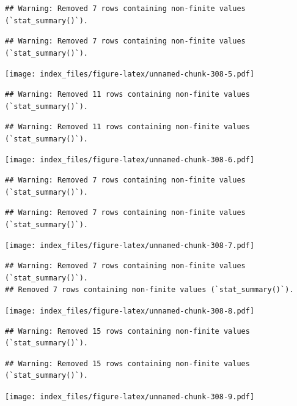 \documentclass[
]{article}
\begin{document}
\begin{verbatim}
## Warning: Removed 7 rows containing non-finite values (`stat_summary()`).
\end{verbatim}

\begin{verbatim}
## Warning: Removed 7 rows containing non-finite values (`stat_summary()`).
\end{verbatim}

\texttt{[image: index\_files/figure-latex/unnamed-chunk-308-5.pdf]}

\begin{verbatim}
## Warning: Removed 11 rows containing non-finite values (`stat_summary()`).
\end{verbatim}

\begin{verbatim}
## Warning: Removed 11 rows containing non-finite values (`stat_summary()`).
\end{verbatim}

\texttt{[image: index\_files/figure-latex/unnamed-chunk-308-6.pdf]}

\begin{verbatim}
## Warning: Removed 7 rows containing non-finite values (`stat_summary()`).
\end{verbatim}

\begin{verbatim}
## Warning: Removed 7 rows containing non-finite values (`stat_summary()`).
\end{verbatim}

\texttt{[image: index\_files/figure-latex/unnamed-chunk-308-7.pdf]}

\begin{verbatim}
## Warning: Removed 7 rows containing non-finite values (`stat_summary()`).
## Removed 7 rows containing non-finite values (`stat_summary()`).
\end{verbatim}

\texttt{[image: index\_files/figure-latex/unnamed-chunk-308-8.pdf]}

\begin{verbatim}
## Warning: Removed 15 rows containing non-finite values (`stat_summary()`).
\end{verbatim}

\begin{verbatim}
## Warning: Removed 15 rows containing non-finite values (`stat_summary()`).
\end{verbatim}

\texttt{[image: index\_files/figure-latex/unnamed-chunk-308-9.pdf]}
\end{document}
